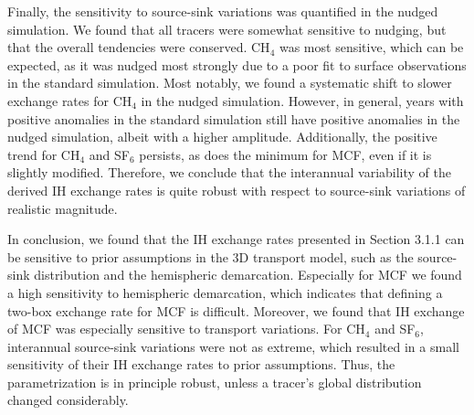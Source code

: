 \documentclass[10pt]{article}
\begin{document}
Finally, the sensitivity to source-sink variations was quantified in the nudged simulation. We found that all tracers were somewhat sensitive to nudging, but that the overall tendencies were conserved. CH$_4$ was most sensitive, which can be expected, as it was nudged most strongly due to a poor fit to surface observations in the standard simulation. Most notably, we found a systematic shift to slower exchange rates for CH$_4$ in the nudged simulation. However, in general, years with positive anomalies in the standard simulation still have positive anomalies in the nudged simulation, albeit with a higher amplitude. Additionally, the positive trend for CH$_4$ and SF$_6$ persists, as does the minimum for MCF, even if it is slightly modified. Therefore, we conclude that the interannual variability of the derived IH exchange rates is quite robust with respect to source-sink variations of realistic magnitude.

In conclusion, we found that the IH exchange rates presented in Section 3.1.1 can be sensitive to prior assumptions in the 3D transport model, such as the source-sink distribution and the hemispheric demarcation. Especially for MCF we found a high sensitivity to hemispheric demarcation, which indicates that defining a two-box exchange rate for MCF is difficult. Moreover, we found that IH exchange of MCF was especially sensitive to transport variations. For CH$_4$ and SF$_6$, interannual source-sink variations were not as extreme, which resulted in a small sensitivity of their IH exchange rates to prior assumptions. Thus, the parametrization is in principle robust, unless a tracer's global distribution changed considerably.


%

\end{document}
